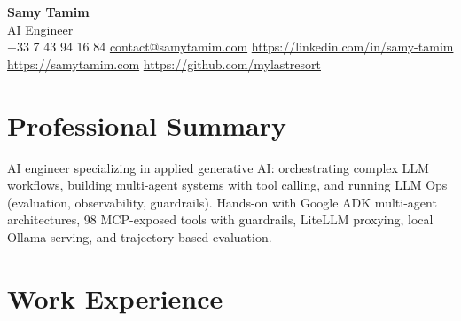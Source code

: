 \documentclass[10pt,a4paper]{article}
\begin{document}
\begin{center}
  {\LARGE\bfseries\color{accent} Samy Tamim}\\[1.5pt]
  {\small AI Engineer}\\[1.5pt]
  \footnotesize
  +33 7 43 94 16 84 \enspace\textbullet\enspace \href{mailto:contact@samytamim.com}{contact@samytamim.com} \enspace\textbullet\enspace \href{https://linkedin.com/in/samy-tamim}{https://linkedin.com/in/samy-tamim} \enspace\textbullet\enspace \href{https://samytamim.com}{https://samytamim.com} \enspace\textbullet\enspace \href{https://github.com/mylastresort}{https://github.com/mylastresort}
\end{center}

\section{Professional Summary}
AI engineer specializing in applied generative AI: orchestrating complex LLM workflows, building multi-agent systems with tool calling, and running LLM Ops (evaluation, observability, guardrails). Hands-on with Google ADK multi-agent architectures, 98 MCP-exposed tools with guardrails, LiteLLM proxying, local Ollama serving, and trajectory-based evaluation.

\section{Work Experience}
\end{document}
